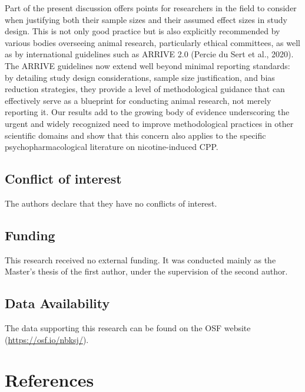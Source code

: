 \documentclass[authordate, meta, issue]{jote-new-article}
\begin{document}
	Part of the present discussion offers points for researchers in the field to consider when justifying both their sample sizes and their assumed effect sizes in study design. This is not only good practice but is also explicitly recommended by various bodies overseeing animal research, particularly ethical committees, as well as by international guidelines such as ARRIVE 2.0 (Percie du Sert et al., 2020). The ARRIVE guidelines now extend well beyond minimal reporting standards: by detailing study design considerations, sample size justification, and bias reduction strategies, they provide a level of methodological guidance that can effectively serve as a blueprint for conducting animal research, not merely reporting it. Our results add to the growing body of evidence underscoring the urgent and widely recognized need to improve methodological practices in other scientific domains and show that this concern also applies to the specific psychopharmacological literature on nicotine-induced CPP.



	\subsection{Conflict of interest}



	The authors declare that they have no conflicts of interest.



	\subsection{Funding}



	This research received no external funding. It was conducted mainly as the Master's thesis of the first author, under the supervision of the second author.



	\subsection{Data Availability}



	The data supporting this research can be found on the OSF website (\url{https://osf.io/nbksj/}).







	\section{References}
\end{document}
